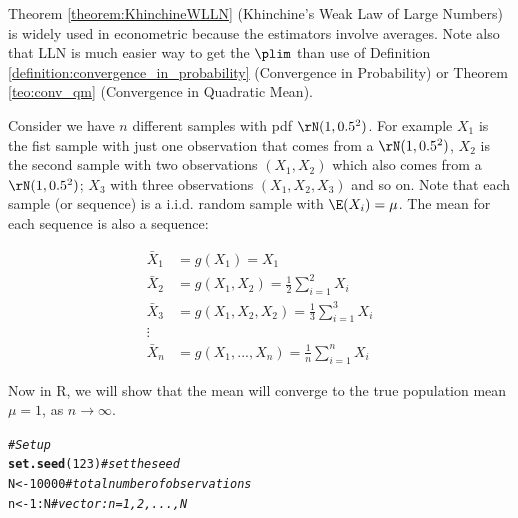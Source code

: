 \documentclass[english,12pt]{book}\usepackage[]{graphicx}\usepackage[]{xcolor}
\makeatletter
\newcommand{\hlnum}[1]{\textcolor[rgb]{0.686,0.059,0.569}{#1}}%
\newcommand{\hlcom}[1]{\textcolor[rgb]{0.678,0.584,0.686}{\textit{#1}}}%
\newcommand{\hlopt}[1]{\textcolor[rgb]{0,0,0}{#1}}%
\newcommand{\hldef}[1]{\textcolor[rgb]{0.345,0.345,0.345}{#1}}%
\newcommand{\hlkwb}[1]{\textcolor[rgb]{0.69,0.353,0.396}{#1}}%
\newcommand{\hlkwd}[1]{\textcolor[rgb]{0.737,0.353,0.396}{\textbf{#1}}}%
\newenvironment{kframe}{%
 \def\at@end@of@kframe{}%
 \ifinner\ifhmode%
  \def\at@end@of@kframe{\end{minipage}}%
  \begin{minipage}{\columnwidth}%
 \fi\fi%
 \def\FrameCommand##1{\hskip\@totalleftmargin \hskip-\fboxsep
 \colorbox{shadecolor}{##1}\hskip-\fboxsep
     \hskip-\linewidth \hskip-\@totalleftmargin \hskip\columnwidth}%
 \MakeFramed {\advance\hsize-\width
   \@totalleftmargin\z@ \linewidth\hsize
   \@setminipage}}%
 {\par\unskip\endMakeFramed%
 \at@end@of@kframe}
\newenvironment{knitrout}{}{} %
\makeatother
\begin{document}
\begin{remark}
  Theorem \ref{theorem:KhinchineWLLN} (Khinchine's Weak Law of Large Numbers) is widely used in econometric because the estimators involve averages. Note also that LLN is much easier way to get the $\plim$ than use of Definition \ref{definition:convergence_in_probability} (Convergence in Probability) or Theorem \ref{teo:conv_qm} (Convergence in Quadratic Mean).
\end{remark}

\begin{example}
  Consider we have $n$ different samples with pdf $\rN(1, 0.5^2)$. For example $X_1$ is the fist sample with just one observation that comes from a $\rN(1, 0.5^2)$,  $X_2$ is the second sample with two observations $(X_1, X_2)$ which also comes from a $\rN(1, 0.5^2)$; $X_3$ with three observations $(X_1, X_2, X_3)$ and so on. Note that each sample (or sequence) is a i.i.d. random sample with $\E(X_i) = \mu$. The mean for each sequence is also a sequence:
  
\begin{equation*}
  \begin{aligned}
    \bar{X}_1 & = g(X_1) = X_1 \\
    \bar{X}_2 & = g(X_1, X_2) = \frac{1}{2}\sum_{i = 1}^2X_i \\
    \bar{X}_3 & = g(X_1, X_2, X_2) = \frac{1}{3}\sum_{i = 1}^3X_i \\
    \vdots \\
    \bar{X}_n & = g(X_1, ..., X_n) = \frac{1}{n}\sum_{i = 1}^nX_i
  \end{aligned}
\end{equation*}

Now in R, we will show that the mean will converge to the true population mean $\mu = 1$, as $n\to \infty$.

\begin{knitrout}
\color{fgcolor}\begin{kframe}
\begin{alltt}
\hlcom{# Setup}
\hlkwd{set.seed}\hldef{(}\hlnum{123}\hldef{)}  \hlcom{# set the seed}
\hldef{N} \hlkwb{<-} \hlnum{10000}     \hlcom{# total number of observations}
\hldef{n} \hlkwb{<-} \hlnum{1}\hlopt{:}\hldef{N}       \hlcom{# vector: n = 1, 2, ..., N}


\end{alltt}
\end{kframe}
\end{knitrout}
\end{example}
\end{document}
